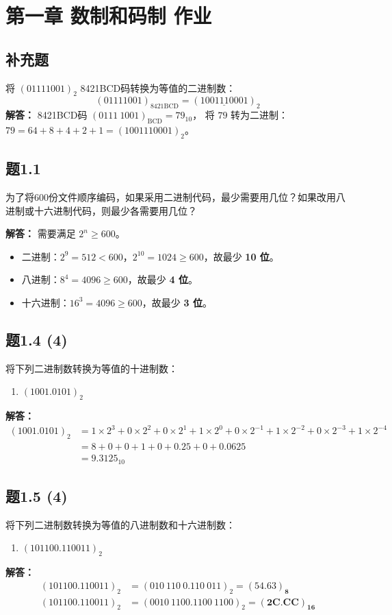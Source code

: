 \section{第一章 数制和码制 作业}

\subsection*{补充题}
将 $(01111001)_2$ 8421BCD码转换为等值的二进制数：
\[
(01111001)_{8421\text{BCD}} = (\underline{1001110001})_2
\]
\textbf{解答：}
8421BCD码 $(0111\ 1001)_\text{BCD} = 79_{10}$，
将 $79$ 转为二进制：$79 = 64+8+4+2+1 = (1001110001)_2$。

\subsection{题1.1}
为了将600份文件顺序编码，如果采用二进制代码，最少需要用几位？如果改用八进制或十六进制代码，则最少各需要用几位？

\textbf{解答：}
需要满足 $2^n \ge 600$。
\begin{itemize}
    \item 二进制：$2^9=512<600$，$2^{10}=1024\ge600$，故最少 \textbf{10 位}。
    \item 八进制：$8^4=4096\ge600$，故最少 \textbf{4 位}。
    \item 十六进制：$16^3=4096\ge600$，故最少 \textbf{3 位}。
\end{itemize}

\subsection{题1.4 (4)}
将下列二进制数转换为等值的十进制数：
\begin{enumerate}
    \item $(1001.0101)_2$
\end{enumerate}
\textbf{解答：}
\[
\begin{aligned}
(1001.0101)_2 &= 1\times2^3 + 0\times2^2 + 0\times2^1 + 1\times2^0 + 0\times2^{-1} + 1\times2^{-2} + 0\times2^{-3} + 1\times2^{-4} \\
&= 8 + 0 + 0 + 1 + 0 + 0.25 + 0 + 0.0625 \\
&= \mathbf{9.3125}_{10}
\end{aligned}
\]

\subsection{题1.5 (4)}
将下列二进制数转换为等值的八进制数和十六进制数：
\begin{enumerate}
    \item $(101100.110011)_2$
\end{enumerate}
\textbf{解答：}
\begin{align*}
(101100.110011)_2 &= (010\ 110\ 0.110\ 011)_2 = \mathbf{(54.63)_8} \\
(101100.110011)_2 &= (0010\ 1100.1100\ 1100)_2 = \mathbf{(2C.CC)_{16}}
\end{align*}


